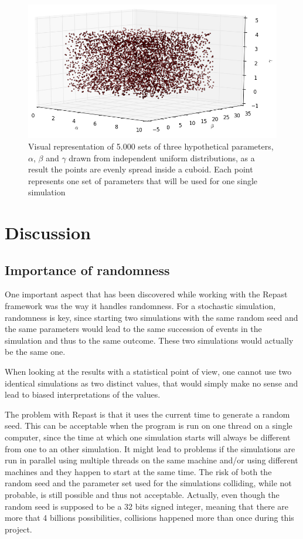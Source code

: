 \documentclass[a4paper,12pt]{report}
\begin{document}
\begin{figure}[!htbp]
	\centering
	\includegraphics[scale=0.65]{../data/abc-space.png}
	\caption{Visual representation of 5.000 sets of three hypothetical parameters, $\alpha$, $\beta$ and $\gamma$ drawn from independent uniform distributions, as a result the points are evenly spread inside a cuboid. Each point represents one set of parameters that will be used for one single simulation}
	\label{abc-space}
\end{figure}



\chapter{Discussion}
\section{Importance of randomness}
One important aspect that has been discovered while working with the Repast framework was the way it handles randomness. For a stochastic simulation, randomness is key, since starting two simulations with the same random seed and the same parameters would lead to the same succession of events in the simulation and thus to the same outcome. These two simulations would actually be the same one.

When looking at the results with a statistical point of view, one cannot use two identical simulations as two distinct values, that would simply make no sense and lead to biased interpretations of the values.

The problem with Repast is that it uses the current time to generate a random seed. This can be acceptable when the program is run on one thread on a single computer, since the time at which one simulation starts will always be different from one to an other simulation. It might lead to problems if the simulations are run in parallel using multiple threads on the same machine and/or using different machines and they happen to start at the same time. The risk of both the random seed and the parameter set used for the simulations colliding, while not probable, is still possible and thus not acceptable. Actually, even though the random seed is supposed to be a 32 bits signed integer, meaning that there are more that 4 billions possibilities, collisions happened more than once during this project.
\end{document}

